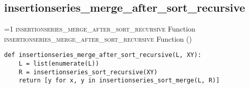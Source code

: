     \subsection{insertionseries\_merge\_after\_sort\_recursive}
\setcounter{insertionseriesmergeaftersortrecursivefunctioncounter}{1}
\newcommand{\insertionseriesmergeaftersortrecursivefunctionframe}{%
    \ifnum\value{insertionseriesmergeaftersortrecursivefunctioncounter}=1
        \textsc{insertionseries\_merge\_after\_sort\_recursive} Function%
    \else
        \textsc{insertionseries\_merge\_after\_sort\_recursive} Function (\theinsertionseriesmergeaftersortrecursivefunctioncounter)%
    \fi
}
        \begin{frame}[containsverbatim]{\insertionseriesmergeaftersortrecursivefunctionframe}
            \begin{verbatim}
def insertionseries_merge_after_sort_recursive(L, XY):
    L = list(enumerate(L))
    R = insertionseries_sort_recursive(XY)
    return [y for x, y in insertionseries_sort_merge(L, R)]
                \end{verbatim}
        \end{frame}

